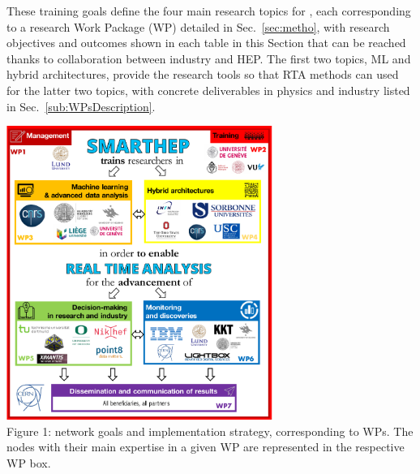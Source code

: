 These training goals define the four main research topics for \acronym, each corresponding to a research Work Package (WP) detailed in Sec.~\ref{sec:metho}, with research objectives and outcomes shown in each table in this Section that can be reached thanks to collaboration between industry and HEP.  
The first two topics, ML and hybrid architectures, provide the research tools so that RTA methods can used for the latter two topics, with concrete deliverables in physics and industry listed in Sec.~\ref{sub:WPsDescription}.  

\begin{center}
\includegraphics[width=0.65\textwidth]{figs/NetworkCompositionCombinedImplementation} \\ %
Figure 1: \acronym network goals and implementation strategy, corresponding to WPs. The nodes with their main expertise in a given WP are represented in the respective WP box.
\end{center}
\normalsize 



